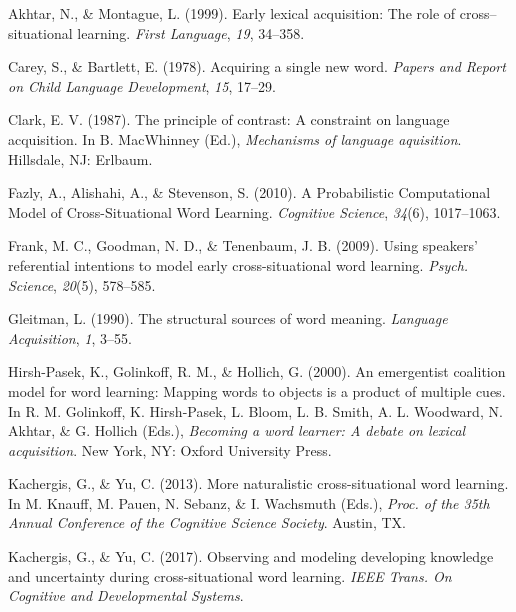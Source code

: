 \documentclass[10pt, letterpaper]{article}
\newenvironment{CSLReferences}%
  {}%
  {\par}
\begin{document}
\hypertarget{refs}{}
\begin{CSLReferences}{1}{0}
\leavevmode{}%
Akhtar, N., \& Montague, L. (1999). Early lexical acquisition: The role
of cross--situational learning. \emph{First Language}, \emph{19},
34--358.

\leavevmode{}%
Carey, S., \& Bartlett, E. (1978). Acquiring a single new word.
\emph{Papers and Report on Child Language Development}, \emph{15},
17--29.

\leavevmode{}%
Clark, E. V. (1987). The principle of contrast: A constraint on language
acquisition. In B. MacWhinney (Ed.), \emph{Mechanisms of language
aquisition}. Hillsdale, NJ: Erlbaum.

\leavevmode{}%
Fazly, A., Alishahi, A., \& Stevenson, S. (2010). {A Probabilistic
Computational Model of Cross-Situational Word Learning}. \emph{Cognitive
Science}, \emph{34}(6), 1017--1063.

\leavevmode{}%
Frank, M. C., Goodman, N. D., \& Tenenbaum, J. B. (2009). Using
speakers' referential intentions to model early cross-situational word
learning. \emph{Psych. Science}, \emph{20}(5), 578--585.

\leavevmode{}%
Gleitman, L. (1990). The structural sources of word meaning.
\emph{Language Acquisition}, \emph{1}, 3--55.

\leavevmode{}%
Hirsh-Pasek, K., Golinkoff, R. M., \& Hollich, G. (2000). An emergentist
coalition model for word learning: Mapping words to objects is a product
of multiple cues. In R. M. Golinkoff, K. Hirsh-Pasek, L. Bloom, L. B.
Smith, A. L. Woodward, N. Akhtar, \& G. Hollich (Eds.), \emph{Becoming a
word learner: A debate on lexical acquisition}. New York, NY: Oxford
University Press.

\leavevmode{}%
Kachergis, G., \& Yu, C. (2013). More naturalistic cross-situational
word learning. In M. Knauff, M. Pauen, N. Sebanz, \& I. Wachsmuth
(Eds.), \emph{{Proc. of the 35th Annual Conference of the Cognitive
Science Society}}. Austin, TX.

\leavevmode{}%
Kachergis, G., \& Yu, C. (2017). Observing and modeling developing
knowledge and uncertainty during cross-situational word learning.
\emph{IEEE Trans. On Cognitive and Developmental Systems}.


\end{CSLReferences}
\end{document}
